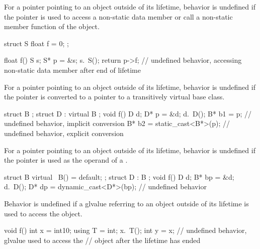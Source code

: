 
\pnum
For a pointer pointing to an object outside of its lifetime,
behavior is undefined
if the pointer is used to access a non-static data member or call a
non-static member function of the object.

\pnum
\begin{example}
\begin{codeblock}
struct S {
  float f = 0;
};

float f() {
  S s;
  S* p = &s;
  s.~S();
  return p->f;  // undefined behavior, accessing non-static data member after end of lifetime
}
\end{codeblock}
\end{example}

\pnum
For a pointer pointing to an object outside of its lifetime,
behavior is undefined
if the pointer is converted
to a pointer to a transitively virtual base class.

\pnum
\begin{example}
\begin{codeblock}
struct B {};
struct D : virtual B {};
void f() {
  D d;
  D* p = &d;
  d.~D();
  B* b1 = p;                    // undefined behavior, implicit conversion
  B* b2 = static_cast<B*>(p);   // undefined behavior, explicit conversion
}
\end{codeblock}
\end{example}


\pnum
For a pointer pointing to an object outside of its lifetime,
behavior is undefined
if the pointer is used as the operand of a
.

\pnum
\begin{example}
\begin{codeblock}
struct B { virtual ~B() = default; };
struct D : B {};
void f()
{
  D d;
  B* bp = &d;
  d.~D();
  D* dp = dynamic_cast<D*>(bp);     // undefined behavior
}
\end{codeblock}
\end{example}


\pnum
Behavior is undefined if a glvalue referring to
an object outside of its lifetime
is used to access the object.

\pnum
\begin{example}
\begin{codeblock}
void f() {
  int x = int{10};
  using T = int;
  x.~T();
  int y = x;    // undefined behavior, glvalue used to access the
                // object after the lifetime has ended
}
\end{codeblock}
\end{example}

